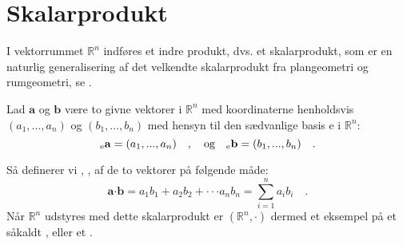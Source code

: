 
\section{Skalarprodukt}



I vektorrummet $\mathbb{R}^{n}$ indføres et indre produkt, dvs. et skalarprodukt,  som er en naturlig generalisering af det velkendte skalarprodukt fra plangeometri og rumgeometri, se .


\begin{definition}[Skalarprodukt] \label{defSkalarProd}
Lad $\mathbf{a}$ og $\mathbf{b}$ være to givne vektorer i $\mathbb{R}^{n}$ med koordinaterne henholdsvis  $(a_{1}, . . . , a_{n})$ og $(b_{1}, . . . , b_{n})$ med hensyn til den sædvanlige basis e i $\mathbb{R}^{n}$:
\begin{equation}
{_\mathrm{e}\mathbf{a}} = (a_{1}, . . . , a_{n})\quad  , \quad \textrm{og} \quad  {_\mathrm{e}\mathbf{b}} = (b_{1}, . . . , b_{n})\quad .
\end{equation}

Så definerer vi ,  , af de to vektorer på følgende måde:
\begin{equation}
\mathbf{a} {\bm{\cdot}} \mathbf{b} =  a_{1}b_{1} + a_{2}b_{2} + \cdot \cdot \cdot a_{n}b_{n} = \sum_{i=1}^{n}a_{i}b_{i} \quad .
\end{equation}
Når $\mathbb{R}^{n}$ udstyres med dette skalarprodukt er $(\mathbb{R}^{n}, \bm{\cdot})$ dermed et eksempel på et såkaldt , eller et .
\end{definition}

